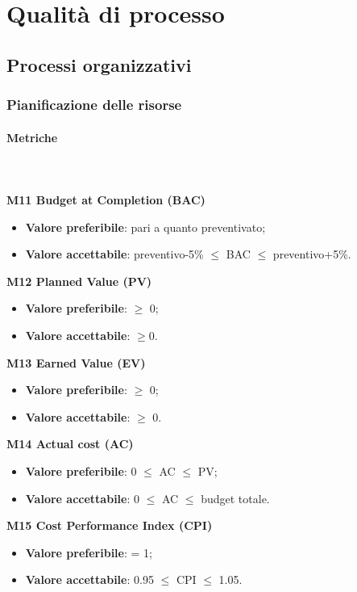 \section{Qualità di processo}
	\subsection{Processi organizzativi}
		\subsubsection{Pianificazione delle risorse}
			\paragraph{Metriche} \mbox{} \\ \\
				\textbf{M11 Budget at Completion (BAC)}
				\begin{itemize}
					\item \textbf{Valore preferibile}: pari a quanto preventivato;
					\item \textbf{Valore accettabile}: preventivo-5\% $\le$ BAC $\le$ preventivo+5\%.
				\end{itemize}
				\textbf{M12 Planned Value (PV)}
				\begin{itemize}
					\item \textbf{Valore preferibile}: $\ge$ 0;
					\item \textbf{Valore accettabile}: $\ge$0.
				\end{itemize}
				\textbf{M13 Earned Value (EV)}
				\begin{itemize}
					\item \textbf{Valore preferibile}: $\ge$ 0;
					\item \textbf{Valore accettabile}: $\ge$ 0.
				\end{itemize}
				\textbf{M14 Actual cost (AC)}
				\begin{itemize}
					\item \textbf{Valore preferibile}: 0 $\le$ AC $\le$ PV;
					\item \textbf{Valore accettabile}: 0 $\le$ AC $\le$ budget totale.
				\end{itemize}
				\textbf{M15 Cost Performance Index (CPI)}
				\begin{itemize}
					\item \textbf{Valore preferibile}: = 1;
					\item \textbf{Valore accettabile}: 0.95 $\le$ CPI $\le$ 1.05.
				\end{itemize}
